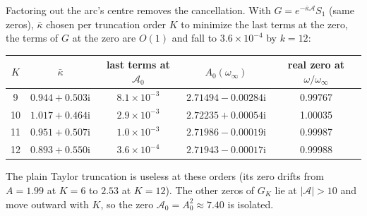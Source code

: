 \documentclass{amsart}
\numberwithin{equation}{section}
\theoremstyle{plain}
\theoremstyle{definition}
\theoremstyle{remark}
\newcommand{\winf}{\omega_\infty}
\newcommand{\iu}{\mathrm{i}}
\begin{document}
Factoring out the arc's centre removes the cancellation. With $G = e^{-\bar\kappa\mathcal A}S_1$ (same zeros), $\bar\kappa$ chosen per
truncation order $K$ to minimize the last terms at the zero, the terms of $G$ at the zero are $O(1)$ and fall to
$3.6\times10^{-4}$ by $k = 12$:
\begin{center}\footnotesize
\begin{tabular}{ccccc}
\toprule
$K$ & $\bar\kappa$ & last terms at $\mathcal A_0$ & $A_0(\winf)$ & real zero at $\omega/\winf$ \\
\midrule
9 & $0.944 + 0.503\iu$ & $8.1\times10^{-3}$ & $2.71494 - 0.00284\iu$ & 0.99767 \\
10 & $1.017 + 0.464\iu$ & $2.9\times10^{-3}$ & $2.72235 + 0.00054\iu$ & 1.00035 \\
11 & $0.951 + 0.507\iu$ & $1.0\times10^{-3}$ & $2.71986 - 0.00019\iu$ & 0.99987 \\
12 & $0.893 + 0.550\iu$ & $3.6\times10^{-4}$ & $2.71943 - 0.00017\iu$ & 0.99988 \\
\bottomrule
\end{tabular}
\end{center}
The plain Taylor truncation is useless at these orders (its zero drifts from $A = 1.99$ at $K = 6$ to $2.53$ at $K = 12$). The
other zeros of $G_K$ lie at $|\mathcal A| > 10$ and move outward with $K$, so the zero $\mathcal A_0 = A_0^2 \approx 7.40$ is isolated.
\end{document}

